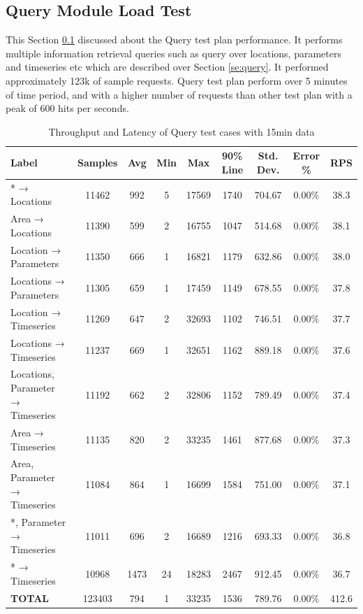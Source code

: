 \subsection{Query Module Load Test}
\label{subse:obs_test_plan_query_15min}
This Section \ref{subse:obs_test_plan_query_15min} discussed about the Query test plan performance. It performs multiple information retrieval queries such as query over locations, parameters and timeseries etc which are described over Section \ref{se:query}. It performed approximately 123k of sample requests.
Query test plan perform over 5 minutes of time period, and with a higher number of requests than other test plan with a peak of 600 hits per seconds.

\begin{table}[ht]
\caption{Throughput and Latency of Query test cases with 15min data}
\footnotesize
\begin{tabulary}{\linewidth}{|L|C|C|C|C|C|C|C|C|}
\hline
Label & Samples & Avg & Min & Max & 90\% Line & Std. Dev. & Error \% & RPS \\ \hline
* → Locations & 11462 & 992 & 5 & 17569 & 1740 & 704.67 & 0.00\% & 38.3 \\ \hline
Area → Locations & 11390 & 599 & 2 & 16755 & 1047 & 514.68 & 0.00\% & 38.1 \\ \hline
Location → Parameters & 11350 & 666 & 1 & 16821 & 1179 & 632.86 & 0.00\% & 38.0 \\ \hline
Locations → Parameters & 11305 & 659 & 1 & 17459 & 1149 & 678.55 & 0.00\% & 37.8 \\ \hline
Location → Timeseries & 11269 & 647 & 2 & 32693 & 1102 & 746.51 & 0.00\% & 37.7 \\ \hline
Locations → Timeseries & 11237 & 669 & 1 & 32651 & 1162 & 889.18 & 0.00\% & 37.6 \\ \hline
Locations, Parameter → Timeseries & 11192 & 662 & 2 & 32806 & 1152 & 789.49 & 0.00\% & 37.4 \\ \hline
Area → Timeseries & 11135 & 820 & 2 & 33235 & 1461 & 877.68 & 0.00\% & 37.3 \\ \hline
Area, Parameter → Timeseries & 11084 & 864 & 1 & 16699 & 1584 & 751.00 & 0.00\% & 37.1 \\ \hline
*, Parameter → Timeseries & 11011 & 696 & 2 & 16689 & 1216 & 693.33 & 0.00\% & 36.8 \\ \hline
* → Timeseries & 10968 & 1473 & 24 & 18283 & 2467 & 912.45 & 0.00\% & 36.7 \\ \hline
\textbf{TOTAL} & 123403 & 794 & 1 & 33235 & 1536 & 789.76 & 0.00\% & 412.6 \\ \hline
\end{tabulary}
\label{tab:obs_query_15_min_summary}
\end{table}
